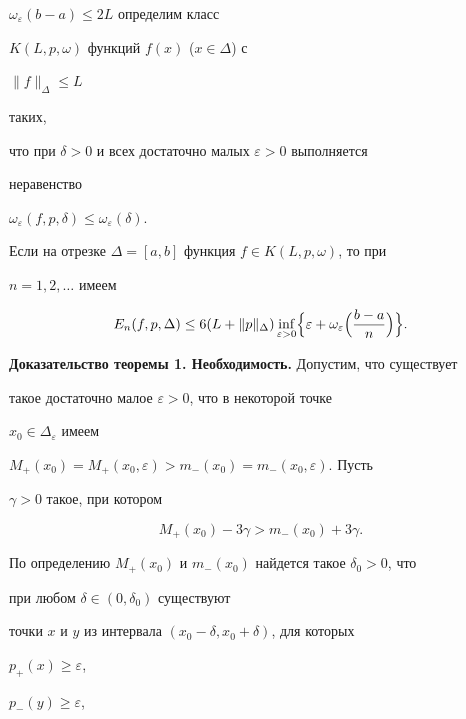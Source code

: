 $\omega_\varepsilon(b-a)\le 2L$ определим класс


$K(L,p,\omega)$ функций $f(x)$ ($x\in\Delta$) с


$\|f\|_\Delta\le L$


таких,


что при $\delta>0$ и всех достаточно малых $\varepsilon>0$ выполняется


неравенство


$\omega_\varepsilon(f,p,\delta)\le\omega_\varepsilon(\delta)$.





\begin{thm}


Если на отрезке $\Delta=[a,b]$ функция $f\in K(L,p,\omega)$, то при


$n=1,2,\dotsc$ имеем


$$


E_n(f,p,\Delta)\le 6(L+\|p\|_\Delta)\inf_{\varepsilon>0}


\Bigl\{\varepsilon+\omega_\varepsilon\Bigl(


\frac{b-a}{n}\Bigr)\Bigr\}.


$$


\end{thm}





{\bf Доказательство теоремы 1. Необходимость.} Допустим, что существует


такое достаточно малое $\varepsilon>0$, что в некоторой точке


$x_0\in\Delta_\varepsilon$ имеем


$M_+(x_0)=M_+(x_0,\varepsilon)>m_-(x_0)=m_-(x_0,\varepsilon)$. Пусть


$\gamma>0$ такое, при котором


\begin{equation}


M_+(x_0)-3\gamma>m_-(x_0)+3\gamma.


\end{equation}


По определению $M_+(x_0)$ и $m_-(x_0)$ найдется такое $\delta_0>0$, что


при любом $\delta\in(0,\delta_0)$ существуют


точки $x$ и $y$ из интервала $(x_0-\delta,x_0+\delta)$, для которых


$p_+(x)\ge\varepsilon$,


$p_-(y)\ge\varepsilon$,


